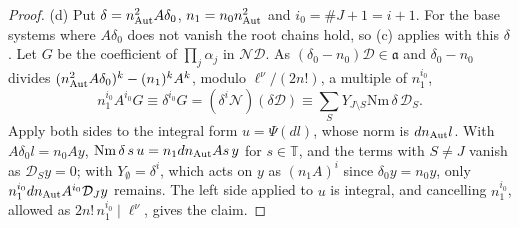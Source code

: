 \begin{proof}
(d) Put $\delta=n_{\rm Aut}^2A\delta_0$, $n_1=n_0n_{\rm Aut}^2$ and $i_0=\#J+1=i+1$. For the base systems where $A\delta_0$ does not vanish the root chains hold, so (c) applies with this $\delta$. Let $G$ be the coefficient of $\prod_j\alpha_j$ in $\mathcal N\mathcal D$. As
$(\delta_0-n_0)\mathcal D\in\mathfrak a$ and $\delta_0-n_0$ divides $(n_{\rm Aut}^2A\delta_0)^k-(n_1)^kA^k$, modulo $\ell^\nu/(2n!)$, a multiple of $n_1^{i_0}$,
\[
  n_1^{i_0}A^{i_0}G\equiv\delta^{i_0}G=(\delta^i\mathcal N)(\delta\mathcal D)\equiv\sum_SY_{J\setminus S}\mathrm{Nm}\,\delta\,\mathcal D_S .
\]
Apply both sides to the integral form $u=\Psi(dl)$, whose norm is $dn_{\rm Aut}l$. With $A\delta_0l=n_0Ay$, $\mathrm{Nm}\,\delta\,s\,u=n_1dn_{\rm Aut}As\,y$ for $s\in\mathbb T$, and the terms with $S\ne J$ vanish as $\mathcal D_Sy=0$; with $Y_\emptyset=\delta^i$, which acts on $y$ as
$(n_1A)^i$ since $\delta_0y=n_0y$, only $n_1^{i_0}dn_{\rm Aut}A^{i_0}\mathcal D_Jy$ remains. The left side applied to $u$ is integral, and cancelling $n_1^{i_0}$, allowed as $2n!\,n_1^{i_0}\mid\ell^\nu$, gives the claim.
\end{proof}


